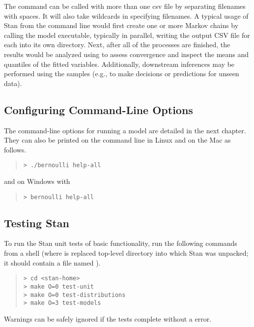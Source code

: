 The command  can be called with more than one csv file
by separating filenames with spaces. It will also take wildcards in
specifying filenames. A typical usage of Stan from the command line
would first create one or more Markov chains by calling the model
executable, typically in parallel, writing the output CSV file for
each into its own directory.  Next, after all of the processes are
finished, the results would be analyzed using  to assess
convergence and inspect the means and quantiles of the fitted
variables.  Additionally, downstream inferences may be performed using
the samples (e.g., to make decisions or predictions for unseen data).

\subsection{Configuring Command-Line Options}

The command-line options for running a model are detailed in
the next chapter. They can also be printed on the command
line in Linux and on the Mac as follows.
%
\begin{quote}
\begin{Verbatim}[fontshape=sl,fontsize=\small]
> ./bernoulli help-all
\end{Verbatim}
\end{quote}
%
and on Windows with
%
\begin{quote}
\begin{Verbatim}[fontshape=sl,fontsize=\small]
> bernoulli help-all
\end{Verbatim}
\end{quote}

\subsection{Testing Stan}

To run the Stan unit tests of basic functionality, run the
following commands from a shell (where  is replaced
top-level directory into which Stan was unpacked; it should contain a
file named ).
%
\begin{quote}
\begin{Verbatim}[fontshape=sl,fontsize=\small]
> cd <stan-home>
> make O=0 test-unit
> make O=0 test-distributions
> make O=3 test-models
\end{Verbatim}
\end{quote}
%
Warnings can be safely ignored if the tests complete without a
 error.

